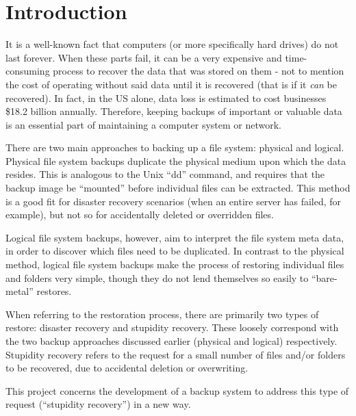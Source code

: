 \section{Introduction}

It is a well-known fact that computers (or more specifically hard drives) do
not last forever. When these parts fail, it can be a very expensive and
time-consuming process to recover the data that was stored on them - not to
mention the cost of operating without said data until it is recovered (that is
if it \emph{can} be recovered). In fact, in the US alone, data loss is
estimated to cost businesses \$18.2 billion annually\cite{smith03}. Therefore,
keeping backups of important or valuable data is an essential part of
maintaining a computer system or network.

There are two main approaches to backing up a file system: physical and
logical\cite{hutchinson99}. Physical file system backups duplicate the physical
medium upon which the data resides. This is analogous to the Unix ``dd''
command, and requires that the backup image be ``mounted'' before individual
files can be extracted. This method is a good fit for disaster recovery
scenarios (when an entire server has failed, for example), but not so for
accidentally deleted or overridden files.

Logical file system backups, however, aim to interpret the file system meta
data, in order to discover which files need to be duplicated.  In contrast to
the physical method, logical file system backups make the process of restoring
individual files and folders very simple, though they do not lend themselves so
easily to ``bare-metal'' restores.

When referring to the restoration process, there are primarily two types of
restore: disaster recovery and stupidity recovery\cite{hutchinson99}. These
loosely correspond with the two backup approaches discussed earlier (physical
and logical) respectively. Stupidity recovery refers to the request for a small
number of files and/or folders to be recovered, due to accidental deletion or
overwriting.

This project concerns the development of a backup system to address this type
of request (``stupidity recovery'') in a new way.

